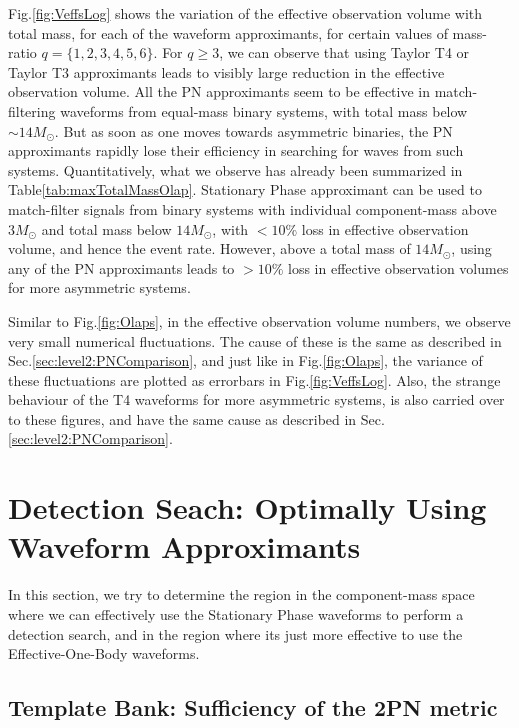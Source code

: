\documentclass[aps,
prd,
amsmath,
amssymb,
twocolumn,
floatfix,
groupedaddress]{revtex4-1}
\begin{document}
Fig.\ref{fig:VeffsLog} shows the variation of the effective observation volume with total mass, for each of the waveform approximants, for certain values of mass-ratio $q=\{1,2,3,4,5,6\}$. For $q\geq 3$, we can observe that using Taylor T4 or Taylor T3 approximants leads to visibly large reduction in the effective observation volume. All the PN approximants seem to be effective in match-filtering waveforms from equal-mass binary systems, with total mass below $\sim 14M_{\odot}$. But as soon as one moves towards asymmetric binaries, the PN approximants rapidly lose their efficiency in searching for waves from such systems. Quantitatively, what we observe has already been summarized in Table\ref{tab:maxTotalMassOlap}. Stationary Phase approximant can be used to match-filter signals from binary systems with individual component-mass above $3M_{\odot}$ and total mass below $14M_{\odot}$, with $<10\%$ loss in effective observation volume, and hence the event rate. However, above a total mass of $14M_{\odot}$, using any of the PN approximants leads to $>10\%$ loss in effective observation volumes for more asymmetric systems.

Similar to Fig.\ref{fig:Olaps}, in the effective observation volume numbers, we observe very small numerical fluctuations. The cause of these is the same as described in Sec.\ref{sec:level2:PNComparison}, and just like in Fig.\ref{fig:Olaps}, the variance of these fluctuations are plotted as errorbars in Fig.\ref{fig:VeffsLog}. Also, the strange behaviour of the T4 waveforms for more asymmetric systems, is also carried over to these figures, and have the same cause as described in Sec.\ref{sec:level2:PNComparison}.


\section{Detection Seach: Optimally Using Waveform Approximants}\label{sec:level1:DetectionSeach}

In this section, we try to determine the region in the component-mass space where we can effectively use the Stationary Phase waveforms to perform a detection search, and in the region where its just more effective to use the Effective-One-Body waveforms.

\subsection{Template Bank: Sufficiency of the 2PN metric}\label{sec:level2:TemplateBank}
\end{document}
